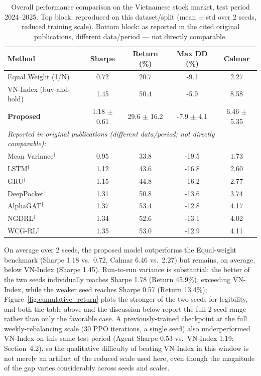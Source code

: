 \documentclass[runningheads]{llncs}
\begin{document}
\begin{table}[ht]
\centering
\caption{Overall performance comparison on the Vietnamese stock market, test period 2024--2025. Top block: reproduced on this dataset/split (mean $\pm$ std over 2 seeds, reduced training scale). Bottom block: as reported in the cited original publications, different data/period --- not directly comparable.}
\label{tab:overall}
\footnotesize
\setlength{\tabcolsep}{4pt}

\begin{tabular}{lcccc}
\toprule
Method & Sharpe & Return (\%) & Max DD (\%) & Calmar \\
\midrule
Equal Weight (1/N) & 0.72 & 20.7 & -9.1 & 2.27 \\
VN-Index (buy-and-hold) & 1.45 & 50.4 & -5.9 & 8.58 \\
\textbf{Proposed} & 1.18 $\pm$ 0.61 & 29.6 $\pm$ 16.2 & -7.9 $\pm$ 4.1 & 6.46 $\pm$ 5.35 \\
\midrule
\multicolumn{5}{l}{\emph{Reported in original publications (different data/period; not directly comparable):}} \\
Mean Variance$^{\dagger}$ & 0.95 & 33.8 & -19.5 & 1.73 \\
LSTM$^{\dagger}$~\cite{ma2023novel} & 1.12 & 43.6 & -16.8 & 2.60 \\
GRU$^{\dagger}$~\cite{yang2023deep} & 1.15 & 44.8 & -16.2 & 2.77 \\
DeepPocket$^{\dagger}$~\cite{soleymani2021deep} & 1.31 & 50.8 & -13.6 & 3.74 \\
AlphaGAT$^{\dagger}$~\cite{li2025alphagat} & 1.37 & 53.4 & -12.8 & 4.17 \\
NGDRL$^{\dagger}$~\cite{bian2024ngdrl} & 1.34 & 52.6 & -13.1 & 4.02 \\
WCG-RL$^{\dagger}$~\cite{ma2024dynamic} & 1.35 & 53.0 & -12.9 & 4.11 \\
\bottomrule
\end{tabular}

\end{table}
On average over 2 seeds, the proposed model outperforms the Equal-weight benchmark (Sharpe 1.18 vs.\ 0.72, Calmar 6.46 vs.\ 2.27) but remains, on average, below VN-Index (Sharpe 1.45). Run-to-run variance is substantial: the better of the two seeds individually reaches Sharpe 1.78 (Return 45.9\%), exceeding VN-Index, while the weaker seed reaches Sharpe 0.57 (Return 13.4\%); Figure~\ref{fig:cumulative_return} plots the stronger of the two seeds for legibility, and both the table above and the discussion below report the full 2-seed range rather than only the favorable case. A previously-trained checkpoint at the full weekly-rebalancing scale (30 PPO iterations, a single seed) also underperformed VN-Index on this same test period (Agent Sharpe 0.53 vs.\ VN-Index 1.19; Section~4.2), so the qualitative difficulty of beating VN-Index in this window is not merely an artifact of the reduced scale used here, even though the magnitude of the gap varies considerably across seeds and scales.
\end{document}
